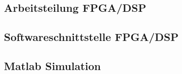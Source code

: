 
\subsection{Arbeitsteilung FPGA/DSP}

\subsection{Softwareschnittstelle FPGA/DSP}

\subsection{Matlab Simulation}

